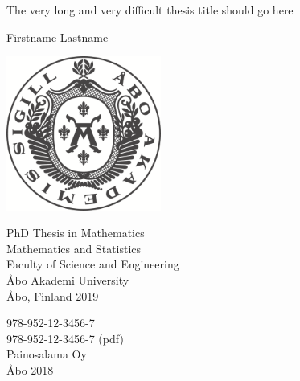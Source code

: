 

\thispagestyle{empty}

\begin{center}
    \Huge
    
    \noindent The very long and very difficult thesis title should go here
    
    \vfill
    \vfill
    
    \LARGE
    \noindent Firstname Lastname
    
    \vfill
    \vfill
    
    \includegraphics[width=0.38\textwidth]{sigill.png}
    
    \vfill
    
    \large
    
    \noindent
    PhD Thesis in Mathematics\\
    Mathematics and Statistics\\
    Faculty of Science and Engineering\\
    {\AA}bo Akademi University\\
    \vfill
    {\AA}bo, Finland 2019

\end{center}


\clearpage
\thispagestyle{empty}

\null\vfill

\begin{center}
   
	978-952-12-3456-7 \\
    978-952-12-3456-7 (pdf)\\
	\vspace{5mm}
	Painosalama Oy\\
	{\AA}bo 2018
\end{center}

